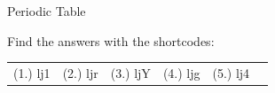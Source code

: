 \begin{eocexercises}{ Periodic Table}
\begin{enumerate}[noitemsep, label=\textbf{\arabic*}. ]
\end{enumerate}
  \label{4e3d8e3d8992782b4e5d6fd958df32f9**end}
\par {} Find the answers with the shortcodes:
 \par \begin{tabular}[h]{cccccc}
 (1.) lj1  &  (2.) ljr  &  (3.) ljY  &  (4.) ljg  & (5.) lj4 \end{tabular}
\end{eocexercises}

